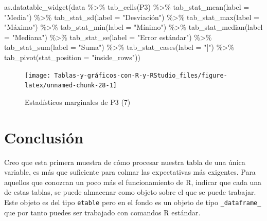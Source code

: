 \documentclass[
]{book}
\newenvironment{Shaded}{\begin{snugshade}}{\end{snugshade}}
\newcommand{\AttributeTok}[1]{\textcolor[rgb]{0.77,0.63,0.00}{#1}}
\newcommand{\FunctionTok}[1]{\textcolor[rgb]{0.00,0.00,0.00}{#1}}
\newcommand{\NormalTok}[1]{#1}
\newcommand{\SpecialCharTok}[1]{\textcolor[rgb]{0.00,0.00,0.00}{#1}}
\newcommand{\StringTok}[1]{\textcolor[rgb]{0.31,0.60,0.02}{#1}}
\begin{document}
\begin{Shaded}
\begin{Highlighting}[]
\FunctionTok{as.datatable\_widget}\NormalTok{(data }\SpecialCharTok{\%\textgreater{}\%} \FunctionTok{tab\_cells}\NormalTok{(P3) }\SpecialCharTok{\%\textgreater{}\%} \FunctionTok{tab\_stat\_mean}\NormalTok{(}\AttributeTok{label =} \StringTok{"Media"}\NormalTok{) }\SpecialCharTok{\%\textgreater{}\%} 
  \FunctionTok{tab\_stat\_sd}\NormalTok{(}\AttributeTok{label =} \StringTok{"Desviación"}\NormalTok{) }\SpecialCharTok{\%\textgreater{}\%} \FunctionTok{tab\_stat\_max}\NormalTok{(}\AttributeTok{label =} \StringTok{"Máximo"}\NormalTok{) }\SpecialCharTok{\%\textgreater{}\%} 
  \FunctionTok{tab\_stat\_min}\NormalTok{(}\AttributeTok{label =} \StringTok{"Mínimo"}\NormalTok{) }\SpecialCharTok{\%\textgreater{}\%} \FunctionTok{tab\_stat\_median}\NormalTok{(}\AttributeTok{label =} \StringTok{"Mediana"}\NormalTok{) }\SpecialCharTok{\%\textgreater{}\%} 
  \FunctionTok{tab\_stat\_se}\NormalTok{(}\AttributeTok{label =} \StringTok{"Error estándar"}\NormalTok{) }\SpecialCharTok{\%\textgreater{}\%} \FunctionTok{tab\_stat\_sum}\NormalTok{(}\AttributeTok{label =} \StringTok{"Suma"}\NormalTok{) }\SpecialCharTok{\%\textgreater{}\%} 
  \FunctionTok{tab\_stat\_cases}\NormalTok{(}\AttributeTok{label =} \StringTok{"|"}\NormalTok{) }\SpecialCharTok{\%\textgreater{}\%} \FunctionTok{tab\_pivot}\NormalTok{(}\AttributeTok{stat\_position =} \StringTok{"inside\_rows"}\NormalTok{))}
\end{Highlighting}
\end{Shaded}

\begin{figure}[H]

{\centering \texttt{[image: Tablas-y-gráficos-con-R-y-RStudio\_files/figure-latex/unnamed-chunk-28-1]} 

}

\caption{Estadísticos marginales de P3 (7)}\label{fig:unnamed-chunk-28}
\end{figure}

\hypertarget{conclusiuxf3n-1}{%
\section{Conclusión}\label{conclusiuxf3n-1}}

Creo que esta primera muestra de cómo procesar nuestra tabla de una única variable, es más que suficiente para colmar las expectativas más exigentes. Para aquellos que conozcan un poco más el funcionamiento de R, indicar que cada una de estas tablas, se puede almacenar como objeto sobre el que se puede trabajar. Este objeto es del tipo \texttt{etable} pero en el fondo es un objeto de tipo \texttt{\_dataframe\_} que por tanto puedes ser trabajado con comandos R estándar.
\end{document}
